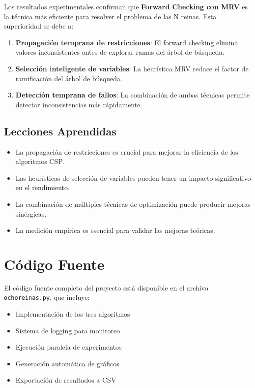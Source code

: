\documentclass[12pt,a4paper]{article}
\begin{document}
Los resultados experimentales confirman que \textbf{Forward Checking con MRV} es la técnica más eficiente para resolver el problema de las N reinas. Esta superioridad se debe a:

\begin{enumerate}
    \item \textbf{Propagación temprana de restricciones}: El forward checking elimina valores inconsistentes antes de explorar ramas del árbol de búsqueda.
    
    \item \textbf{Selección inteligente de variables}: La heurística MRV reduce el factor de ramificación del árbol de búsqueda.
    
    \item \textbf{Detección temprana de fallos}: La combinación de ambas técnicas permite detectar inconsistencias más rápidamente.
\end{enumerate}

\subsection{Lecciones Aprendidas}

\begin{itemize}
    \item La propagación de restricciones es crucial para mejorar la eficiencia de los algoritmos CSP.
    \item Las heurísticas de selección de variables pueden tener un impacto significativo en el rendimiento.
    \item La combinación de múltiples técnicas de optimización puede producir mejoras sinérgicas.
    \item La medición empírica es esencial para validar las mejoras teóricas.
\end{itemize}

\section{Código Fuente}

El código fuente completo del proyecto está disponible en el archivo \texttt{ochoreinas.py}, que incluye:

\begin{itemize}
    \item Implementación de los tres algoritmos
    \item Sistema de logging para monitoreo
    \item Ejecución paralela de experimentos
    \item Generación automática de gráficos
    \item Exportación de resultados a CSV
\end{itemize}
\end{document}
